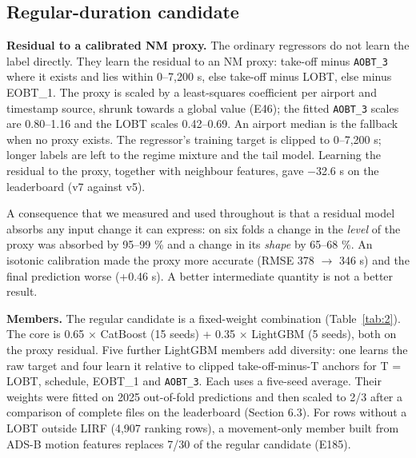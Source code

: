 \documentclass[
  manuscript=article,  %
  layout=preprint,     %
  year=2026,
  volume=4,
]{extra/joas}
\begin{document}
\subsection{Regular-duration candidate}\label{regular-duration-candidate}

\textbf{Residual to a calibrated NM proxy.} The ordinary regressors do not learn the label directly. They learn the residual to an NM proxy: take-off minus \texttt{AOBT\_\allowbreak{}3} where it exists and lies within 0--7,200 s, else take-off minus LOBT, else minus EOBT\_1. The proxy is scaled by a least-squares coefficient per airport and timestamp source, shrunk towards a global value (E46); the fitted \texttt{AOBT\_\allowbreak{}3} scales are 0.80--1.16 and the LOBT scales 0.42--0.69. An airport median is the fallback when no proxy exists. The regressor's training target is clipped to 0--7,200 s; longer labels are left to the regime mixture and the tail model. Learning the residual to the proxy, together with neighbour features, gave $-$32.6 s on the leaderboard (v7 against v5).

A consequence that we measured and used throughout is that a residual model absorbs any input change it can express: on six folds a change in the \emph{level} of the proxy was absorbed by 95--99 \% and a change in its \emph{shape} by 65--68 \%. An isotonic calibration made the proxy more accurate (RMSE 378 $\rightarrow$ 346 s) and the final prediction worse (+0.46 s). A better intermediate quantity is not a better result.

\textbf{Members.} The regular candidate is a fixed-weight combination (Table~\ref{tab:2}). The core is 0.65 $\times$ CatBoost \autocite{prokhorenkova2018catboost} (15 seeds) + 0.35 $\times$ LightGBM (5 seeds), both on the proxy residual. Five further LightGBM members add diversity: one learns the raw target and four learn it relative to clipped take-off-minus-T anchors for T = LOBT, schedule, EOBT\_1 and \texttt{AOBT\_\allowbreak{}3}. Each uses a five-seed average. Their weights were fitted on 2025 out-of-fold predictions and then scaled to 2/3 after a comparison of complete files on the leaderboard (Section 6.3). For rows without a LOBT outside LIRF (4,907 ranking rows), a movement-only member built from ADS-B motion features replaces 7/30 of the regular candidate (E185).
\end{document}
